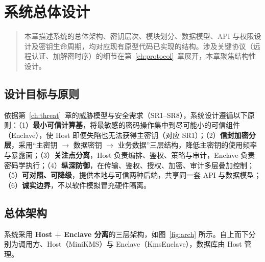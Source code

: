 \chapter{系统总体设计}
\label{ch:design}

\begin{quote}\small
本章描述系统的总体架构、密钥层次、模块划分、数据模型、API 与权限设计及密钥生命周期，均对应现有原型代码已实现的结构。涉及关键协议（远程认证、加解密时序）的细节在第~\ref{ch:protocol}~章展开，本章聚焦结构性设计。
\end{quote}

\section{设计目标与原则}

依据第~\ref{ch:threat}~章的威胁模型与安全需求（SR1--SR8），系统设计遵循以下原则：（1）\textbf{最小可信计算基}，将最敏感的密码操作集中到尽可能小的可信组件（Enclave），使 Host 即便失陷也无法获得主密钥（对应 SR1）；（2）\textbf{信封加密分层}，采用“主密钥 $\rightarrow$ 数据密钥 $\rightarrow$ 业务数据”三层结构，降低主密钥的使用频率与暴露面；（3）\textbf{关注点分离}，Host 负责编排、鉴权、策略与审计，Enclave 负责密码学执行；（4）\textbf{纵深防御}，在传输、鉴权、授权、加密、审计多层叠加控制；（5）\textbf{可对照、可降级}，提供本地与可信两种后端，共享同一套 API 与数据模型；（6）\textbf{诚实边界}，不以软件模拟冒充硬件隔离。

\section{总体架构}

系统采用 \textbf{Host + Enclave 分离}的三层架构，如图~\ref{fig:arch} 所示。自上而下分别为调用方、Host（MiniKMS）与 Enclave（KmsEnclave），数据库由 Host 管理。

